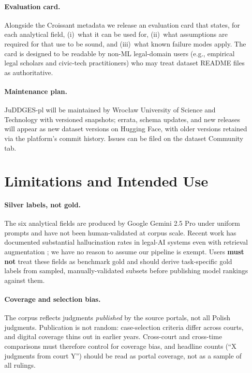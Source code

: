 \documentclass{article}
\begin{document}
\paragraph{Evaluation card.} Alongside the Croissant metadata we release an evaluation card that states, for each analytical field, (i)~what it can be used for, (ii)~what assumptions are required for that use to be sound, and (iii)~what known failure modes apply. The card is designed to be readable by non-ML legal-domain users (e.g., empirical legal scholars and civic-tech practitioners) who may treat dataset README files as authoritative.

\paragraph{Maintenance plan.} JuDDGES-pl will be maintained by Wrocław University of Science and Technology with versioned snapshots; errata, schema updates, and new releases will appear as new dataset versions on Hugging Face, with older versions retained via the platform's commit history. Issues can be filed on the dataset Community tab.

\section{Limitations and Intended Use}
\label{sec:limitations}

\paragraph{Silver labels, not gold.} The six analytical fields are produced by Google Gemini 2.5 Pro under uniform prompts and have not been human-validated at corpus scale. Recent work has documented substantial hallucination rates in legal-AI systems even with retrieval augmentation \citep{magesh2024hallucinationlegalai}; we have no reason to assume our pipeline is exempt. Users \textbf{must not} treat these fields as benchmark gold and should derive task-specific gold labels from sampled, manually-validated subsets before publishing model rankings against them.

\paragraph{Coverage and selection bias.} The corpus reflects judgments \emph{published} by the source portals, not all Polish judgments. Publication is not random: case-selection criteria differ across courts, and digital coverage thins out in earlier years. Cross-court and cross-time comparisons must therefore control for coverage bias, and headline counts (``X\,judgments from court Y'') should be read as portal coverage, not as a sample of all rulings.
\end{document}
